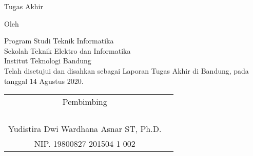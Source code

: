 \clearpage
\pagestyle{empty}

\begin{center}
    \smallskip

    \Large \bfseries \MakeUppercase{\thetitle}
    \vfill

    \Large Tugas Akhir
    \vfill

    \large Oleh

    \Large \theauthor

    \large Program Studi Teknik Informatika \\
    Sekolah Teknik Elektro dan Informatika \\
    Institut Teknologi Bandung \\

    \vfill
    \normalsize \normalfont
    Telah disetujui dan disahkan sebagai Laporan Tugas Akhir di Bandung, pada tanggal 14 Agustus 2020.

    \vfill
    \setlength{\tabcolsep}{12pt}
    \begin{tabular}{c@{\hskip 0in}c}
        Pembimbing                             \\
         &                                     \\
         &                                     \\
         &                                     \\
         &                                     \\
        Yudistira Dwi Wardhana Asnar ST, Ph.D. \\
        NIP. 19800827 201504 1 002             \\
    \end{tabular}

\end{center}
\clearpage
